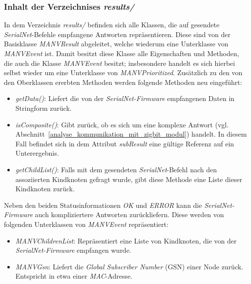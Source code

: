     \subsubsection{Inhalt der Verzeichnises \emph{results/}}

    In dem Verzeichnis \emph{results/} befinden sich alle Klassen, die auf gesendete \emph{SerialNet}-Befehle empfangene 
    Antworten repräsentieren. Diese sind von der Basisklasse \emph{MANVResult} abgeleitet, welche wiederum eine Unterklasse 
    von \emph{MANVEvent} ist.  Damit besitzt diese Klasse alle Eigenschaften und Methoden, die auch die 
    Klasse \emph{MANVEvent} besitzt; insbesondere handelt es sich hierbei selbst wieder um eine Unterklasse
    von \emph{MANVPrioritized}. 
    Zusätzlich zu den von den Oberklassen ererbten Methoden werden folgende Methoden neu eingeführt:

    \begin{itemize}
        \item{\emph{getData()}:} Liefert die von der \emph{SerialNet-Firmware} empfangenen Daten in Stringform zurück. 
        \item{\emph{isComposite()}:} Gibt zurück, ob es sich um eine komplexe Antwort (vgl. 
                            Abschnitt~\ref{analyse_kommunikation_mit_zigbit_modul}) handelt. In diesem Fall befindet 
                            sich in dem Attribut \emph{subResult} eine gültige Referenz auf ein Unterergebnis.
        \item{\emph{getChildList()}:} Falls mit dem gesendeten \emph{SerialNet}-Befehl nach den assoziierten Kindknoten gefragt wurde,
                             gibt diese Methode eine Liste dieser Kindknoten zurück.
    \end{itemize}

    Neben den beiden Statusinformationen \emph{OK} und \emph{ERROR} kann die \emph{SerialNet-Firmware} auch 
    kompliziertere Antworten zurückliefern. Diese werden von folgenden Unterklassen von \emph{MANVEvent} repräsentiert:
        
    \begin{itemize}
        \item{\emph{MANVChildrenList}:} Repräsentiert eine Liste von Kindknoten, die von der \emph{SerialNet-Firmware}
                                 empfangen wurde.
        \item{\emph{MANVGsn}:} Liefert die \emph{Global Subscriber Number} (GSN) einer Node zurück. Entspricht in etwa einer 
                        \emph{MAC}-Adresse.
    \end{itemize}

